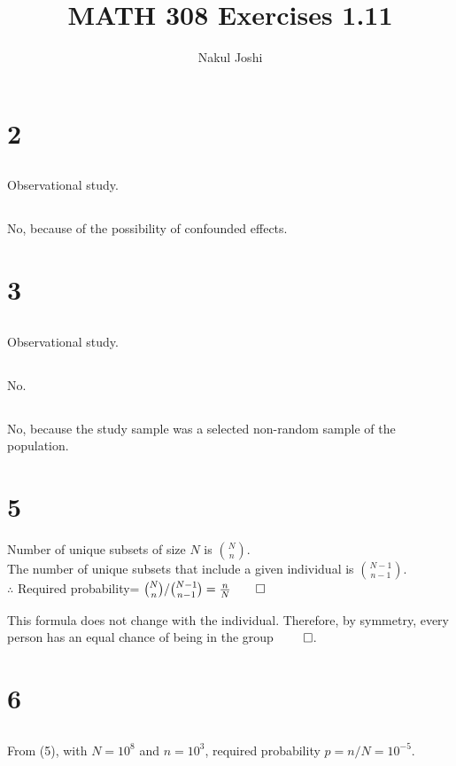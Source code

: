 \documentclass[twocolumn]{article}
\title{MATH 308 Exercises 1.11}
\author{Nakul Joshi}
\begin{document}
\maketitle

\section*{2}
\subsection{} Observational study.
\subsection{} No, because of the possibility of confounded effects.

\section*{3}
\subsection{} Observational study.
\subsection{} No.
\subsection{} No, because the study sample was a selected non-random sample of the population.

\section*{5}
Number of unique subsets of size $N$ is $\binom{N}{n}$.\\
The number of unique subsets that include a given individual is $\binom{N-1}{n-1}$.\\
$\therefore$ Required probability= $\binom{N}{n}/\binom{N-1}{n-1}=\frac{n}{N} \qed$

This formula does not change with the individual. Therefore, by symmetry, every person has an equal chance of being in the group $\qed$.

\section*{6}
\subsection{} From (5), with $N=10^8$ and $n=10^3$, required probability $p= n/N=10^{-5}$.
\end{document}
